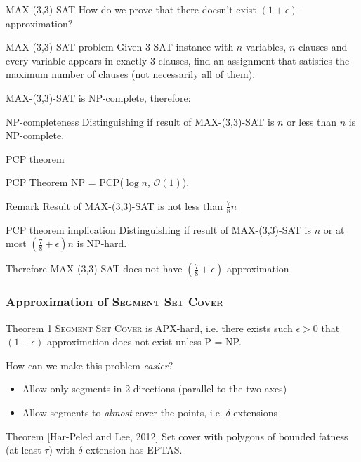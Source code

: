 \documentclass{beamer}
\begin{document}
\begin{frame}{\textsc{MAX-(3,3)-SAT}}
How do we prove that there doesn't exist $(1+\epsilon)$-approximation?


\begin{block}{\textsc{MAX-(3,3)-SAT} problem}
Given 3-SAT instance with $n$ variables, $n$ clauses
and every variable appears in exactly 3 clauses,
find an assignment
that satisfies the maximum number of clauses
(not necessarily all of them).
\end{block}

MAX-(3,3)-SAT is NP-complete, therefore:

\begin{block}{NP-completeness}
Distinguishing if result of MAX-(3,3)-SAT is
$n$ or less than $n$ is NP-complete.
\end{block}
\end{frame}

\begin{frame}{PCP theorem}
\begin{block}{PCP Theorem}
NP = PCP($\log n$, $\mathcal{O}(1)$).
\end{block}

\begin{block}{Remark}
Result of MAX-(3,3)-SAT is not less than $\frac{7}{8}n$
\end{block}

\begin{block}{PCP theorem implication}
Distinguishing if result of MAX-(3,3)-SAT is $n$
or at most $(\frac{7}{8} + \epsilon)n$ is NP-hard.
\end{block}

Therefore MAX-(3,3)-SAT does not have
$(\frac{7}{8}+\epsilon)$-approximation
\end{frame}


\begin{frame}
\frametitle{Approximation of \textsc{Segment Set Cover}}
\begin{block}{Theorem 1}
	\textsc{Segment Set Cover} is APX-hard, i.e.
	there exists such $\epsilon>0$
	that $(1+\epsilon)$-approximation does not exist unless P = NP.
\end{block}

How can we make this problem \textit{easier}?
\begin{itemize}
\item Allow only segments in 2 directions (parallel to the two axes)
\item Allow segments to \textit{almost} cover the points, i.e. $\delta$-extensions
\end{itemize}

\begin{block}{Theorem [Har-Peled and Lee, 2012]}
	Set cover with polygons of bounded fatness (at least $\tau$)
	with $\delta$-extension has EPTAS.
\end{block}

\end{frame}
\end{document}
